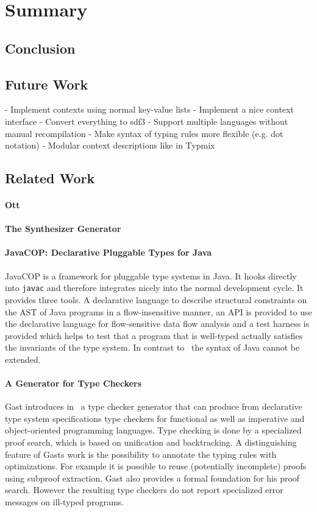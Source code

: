 \chapter{Summary}
\section{Conclusion}
\section{Future Work}
- Implement contexts using normal key-value lists
- Implement a nice context interface
- Convert everything to sdf3
- Support multiple languages without manual recompilation
- Make syntax of typing rules more flexible (e.g. dot notation)
- Modular context descriptions like in Typmix
\section{Related Work}
\subsubsection{Ott}
\subsubsection{The Synthesizer Generator}
\subsubsection{JavaCOP: Declarative Pluggable Types for Java}
JavaCOP \cite{Markstrum:2010:JDP:1667048.1667049} is a framework for
pluggable type systems in Java. It hooks directly into \verb|javac|
and therefore integrates nicely into the normal development cycle. It
provides three tools. A declarative language to describe structural
constraints on the AST of Java programs in a flow-insensitive
manner, an API is provided to use the declarative language for
flow-sensitive data flow analysis and a test harness is provided which
helps to test that a program that is well-typed actually satisfies the
invariants of the type system. In contrast to~\cite{bergan2007typmix}
the syntax of Java cannot be extended.

\subsubsection{A Generator for Type Checkers}
Gast introduces in~\cite{gast2005generator} a type checker generator
that can produce from declarative type system specifications type
checkers for functional as well as imperative and object-oriented
programming languages. Type checking is done by a specialized proof
search, which is based on unification and backtracking. A
distinguishing feature of Gasts work is the possibility to annotate
the typing rules with optimizations. For example it is possible to
reuse (potentially incomplete) proofs using subproof extraction. Gast
also provides a formal foundation for his proof search. However the
resulting type checkers do not report specialized error messages on
ill-typed  programs.

